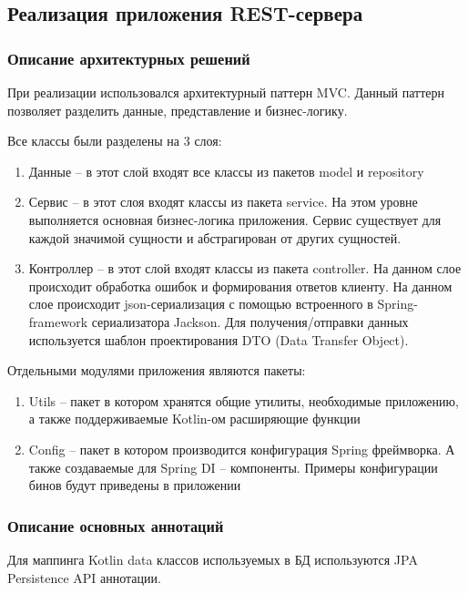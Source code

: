 \subsection{Реализация приложения REST-сервера}\label{subsec:3-impl-server}\indent

\subsubsection{Описание архитектурных решений}\indent

При реализации использовался архитектурный паттерн MVC. Данный паттерн позволяет разделить данные, представление и бизнес-логику.

Все классы были разделены на 3 слоя:
\begin{enumerate}
    \item Данные – в этот слой входят все классы из пакетов model и repository
    \item Сервис – в этот слоя входят классы из пакета service.
    На этом уровне выполняется основная бизнес-логика приложения.
    Сервис существует для каждой значимой сущности и абстрагирован от других сущностей.
    \item Контроллер – в этот слой входят классы из пакета controller.
    На данном слое происходит обработка ошибок и формирования ответов клиенту.
    На данном слое происходит json-сериализация с помощью встроенного в Spring-framework сериализатора Jackson.
    Для получения/отправки данных используется шаблон проектирования DTO (Data Transfer Object).
\end{enumerate}
Отдельными модулями приложения являются пакеты:

\begin{enumerate}
    \item Utils – пакет в котором хранятся общие утилиты, необходимые приложению, а также поддерживаемые Kotlin-ом расширяющие функции
    \item Config – пакет в котором производится конфигурация Spring фреймворка.
    А также создаваемые для Spring DI – компоненты. Примеры конфигурации бинов будут приведены в приложении
\end{enumerate}

\subsubsection{Описание основных аннотаций}\indent

Для маппинга Kotlin data классов используемых в БД используются JPA Persistence API аннотации.

